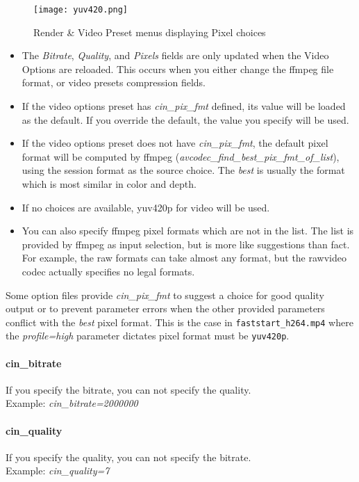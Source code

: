 \begin{figure}[htpb] \centering
  \texttt{[image: yuv420.png]}
  \caption{Render \& Video Preset menus displaying Pixel choices}
  \label{fig:yuv420}
\end{figure}

\begin{itemize}
\item The \textit{Bitrate}, \textit{Quality}, and \textit{Pixels}
  fields are only updated when the Video Options are reloaded.  This
  occurs when you either change the ffmpeg file format, or video
  presets compression fields.
\item If the video options preset has \textit{cin\_pix\_fmt}
  defined, its value will be loaded as the default.  If you override
  the default, the value you specify will be used.
\item If the video options preset does not have
  \textit{cin\_pix\_fmt}, the default pixel format will be computed by
  ffmpeg (\textit{avcodec\_find\_best\_pix\_fmt\_of\_list}), using the
  session format as the source choice.  The \textit{best} is usually
  the format which is most similar in color and depth.
\item If no choices are available, yuv420p for video will be used.
\item You can also specify ffmpeg pixel formats which are not in the
  list.  The list is provided by ffmpeg as input selection, but is
  more like suggestions than fact.  For example, the raw formats can
  take almost any format, but the rawvideo codec actually specifies no
  legal formats.
\end{itemize}

\noindent Some option files provide \textit{cin\_pix\_fmt} to
suggest a choice for good quality output or to prevent parameter
errors when the other provided parameters conflict with the
\textit{best} pixel format.  This is the case in
\texttt{faststart\_h264.mp4} where the \textit{profile=high}
parameter dictates pixel format must be \texttt{yuv420p}.

\paragraph{cin\_bitrate} If you specify the bitrate, you can not
specify the quality.\\ Example: \textit{cin\_bitrate=2000000}

\paragraph{cin\_quality} If you specify the quality, you can not
specify the bitrate.\\ Example: \textit{cin\_quality=7}

